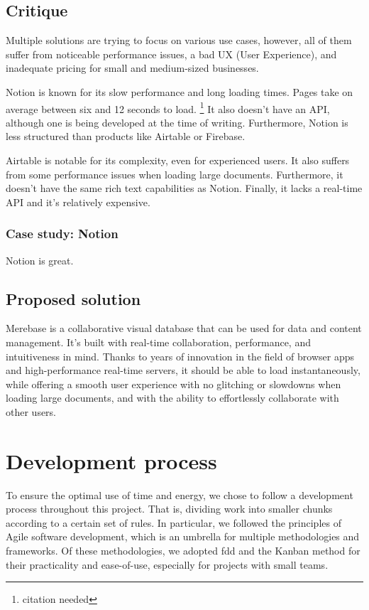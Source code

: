 \subsection{Critique}

Multiple solutions are trying to focus on various use cases, however,
all of them suffer from noticeable performance issues, a bad UX (User
Experience), and inadequate pricing for small and medium-sized
businesses.

Notion is known for its slow performance and long loading times. Pages
take on average between six and 12 seconds to load. \footnote{citation
	needed} It also doesn't have an API, although one is being developed
at the time of writing. Furthermore, Notion is less structured than
products like Airtable or Firebase.

Airtable is notable for its complexity, even for experienced users. It
also suffers from some performance issues when loading large documents.
Furthermore, it doesn't have the same rich text capabilities as Notion.
Finally, it lacks a real-time API and it's relatively expensive.

\subsubsection{Case study: Notion}

Notion is great.

\subsection{Proposed solution}

Merebase is a collaborative visual database that can be used for data
and content management. It's built with real-time collaboration,
performance, and intuitiveness in mind. Thanks to years of innovation in
the field of browser apps and high-performance real-time servers, it
should be able to load instantaneously, while offering a smooth user
experience with no glitching or slowdowns when loading large documents,
and with the ability to effortlessly collaborate with other users.

\section{Development process}

To ensure the optimal use of time and energy, we chose to follow a development process throughout this project.
That is, dividing work into smaller chunks according to a certain set of rules. In particular, we followed the principles of Agile software development, which is an umbrella for multiple methodologies and frameworks.
Of these methodologies, we adopted \acrfull{fdd} and the Kanban method for their practicality and ease-of-use, especially for projects with small teams.

